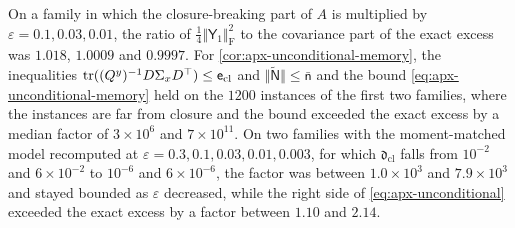 \begin{numcheck}
On a family in which the closure-breaking part of $A$ is multiplied by $\varepsilon=0.1,0.03,0.01$, the ratio of $\frac14\Vert\mathsf Y_1\Vert_{\mathrm F}^2$ to the covariance part of the exact excess was $1.018$, $1.0009$ and $0.9997$. For \cref{cor:apx-unconditional-memory}, the inequalities $\operatorname{tr}((Q^y)^{-1}D\Sigma_xD^\top)\le\mathsf e_{\mathrm{cl}}$ and $\Vert\tilde{\mathsf N}\Vert\le\bar{\mathsf n}$ and the bound \cref{eq:apx-unconditional-memory} held on the $1200$ instances of the first two families, where the instances are far from closure and the bound exceeded the exact excess by a median factor of $3\times10^6$ and $7\times10^{11}$. On two families with the moment-matched model recomputed at $\varepsilon=0.3,0.1,0.03,0.01,0.003$, for which $\mathfrak d_{\mathrm{cl}}$ falls from $10^{-2}$ and $6\times10^{-2}$ to $10^{-6}$ and $6\times10^{-6}$, the factor was between $1.0\times10^3$ and $7.9\times10^3$ and stayed bounded as $\varepsilon$ decreased, while the right side of \cref{eq:apx-unconditional} exceeded the exact excess by a factor between $1.10$ and $2.14$.
\end{numcheck}

